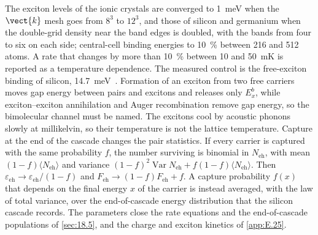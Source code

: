 The exciton levels of the ionic crystals are converged to \SI{1}{meV} when the $\vect{k}$ mesh goes from $8^3$ to $12^3$, and those of silicon and germanium when the double-grid density near the band edges is doubled, with the bands from four to six on each side; central-cell binding energies to \SI{10}{\percent} between 216 and 512 atoms. A rate that changes by more than \SI{10}{\percent} between 10 and \SI{50}{mK} is reported as a temperature dependence. The measured control is the free-exciton binding of silicon, \SI{14.7}{meV}~\cite{shaklee1970valley}. Formation of an exciton from two free carriers moves gap energy between pairs and excitons and releases only $E_x^b$, while exciton--exciton annihilation and Auger recombination remove gap energy, so the bimolecular channel must be named. The excitons cool by acoustic phonons slowly at millikelvin, so their temperature is not the lattice temperature. Capture at the end of the cascade changes the pair statistics. If every carrier is captured with the same probability $f$, the number surviving is binomial in $N_{\mathrm{eh}}$, with mean $(1 - f)\langle N_{\mathrm{eh}}\rangle$ and variance $(1 - f)^2\operatorname{Var}N_{\mathrm{eh}} + f(1 - f)\langle N_{\mathrm{eh}}\rangle$. Then $\varepsilon_{\mathrm{eh}} \to \varepsilon_{\mathrm{eh}}/(1 - f)$ and $F_{\mathrm{eh}} \to (1 - f)F_{\mathrm{eh}} + f$. A capture probability $f(x)$ that depends on the final energy $x$ of the carrier is instead averaged, with the law of total variance, over the end-of-cascade energy distribution that the silicon cascade records. The parameters close the rate equations and the end-of-cascade populations of \cref{sec:18.5}, and the charge and exciton kinetics of \cref{app:E.25}.

